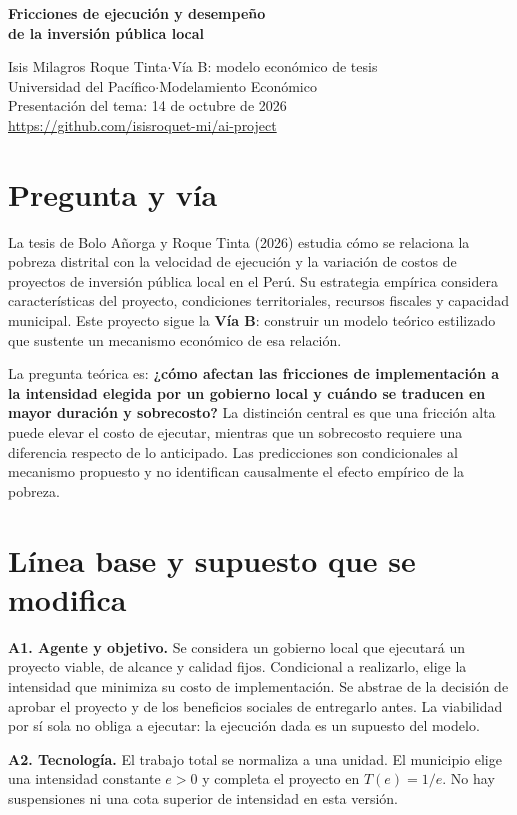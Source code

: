 \documentclass[11pt,a4paper]{article}
\newcommand{\repo}{\url{https://github.com/isisroquet-mi/ai-project}}
\begin{document}
\begin{center}
{\Large\bfseries\color{navy} Fricciones de ejecución y desempeño\\de la inversión pública local}\par
\vspace{3pt}
Isis Milagros Roque Tinta\quad$\cdot$\quad Vía B: modelo económico de tesis\\
Universidad del Pacífico\quad$\cdot$\quad Modelamiento Económico\\
Presentación del tema: 14 de octubre de 2026\\[-2pt]
{\small\repo}
\end{center}
\section{Pregunta y vía}
La tesis de Bolo Añorga y Roque Tinta (2026) estudia cómo se relaciona la pobreza distrital con la velocidad de ejecución y la variación de costos de proyectos de inversión pública local en el Perú. Su estrategia empírica considera características del proyecto, condiciones territoriales, recursos fiscales y capacidad municipal. Este proyecto sigue la \textbf{Vía B}: construir un modelo teórico estilizado que sustente un mecanismo económico de esa relación.

La pregunta teórica es: \textbf{¿cómo afectan las fricciones de implementación a la intensidad elegida por un gobierno local y cuándo se traducen en mayor duración y sobrecosto?} La distinción central es que una fricción alta puede elevar el costo de ejecutar, mientras que un sobrecosto requiere una diferencia respecto de lo anticipado. Las predicciones son condicionales al mecanismo propuesto y no identifican causalmente el efecto empírico de la pobreza.

\section{Línea base y supuesto que se modifica}
\textbf{A1. Agente y objetivo.} Se considera un gobierno local que ejecutará un proyecto viable, de alcance y calidad fijos. Condicional a realizarlo, elige la intensidad que minimiza su costo de implementación. Se abstrae de la decisión de aprobar el proyecto y de los beneficios sociales de entregarlo antes. La viabilidad por sí sola no obliga a ejecutar: la ejecución dada es un supuesto del modelo.

\textbf{A2. Tecnología.} El trabajo total se normaliza a una unidad. El municipio elige una intensidad constante $e>0$ y completa el proyecto en $T(e)=1/e$. No hay suspensiones ni una cota superior de intensidad en esta versión.
\end{document}
